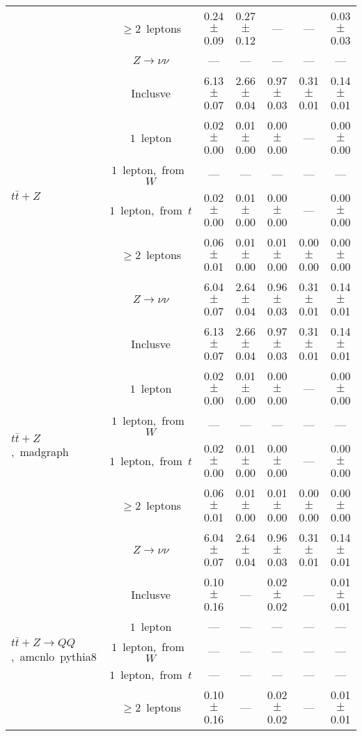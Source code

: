 \documentclass{article}
\begin{document}
\begin{longtable}{|l|c|c|c|c|c|c|}
 & $\ge2$~leptons  & 0.24 $\pm$ 0.09  & 0.27 $\pm$ 0.12  & ---  & ---  & 0.03 $\pm$ 0.03 \\* 
 & $Z\rightarrow\nu\nu$  & ---  & ---  & ---  & ---  & --- \\* 
\hline 
\multirow{6}{*}{$t\bar{t}+Z$} & Inclusve  & 6.13 $\pm$ 0.07  & 2.66 $\pm$ 0.04  & 0.97 $\pm$ 0.03  & 0.31 $\pm$ 0.01  & 0.14 $\pm$ 0.01 \\* 
 & $1$~lepton  & 0.02 $\pm$ 0.00  & 0.01 $\pm$ 0.00  & 0.00 $\pm$ 0.00  & ---  & 0.00 $\pm$ 0.00 \\* 
 & $1$~lepton,~from~$W$  & ---  & ---  & ---  & ---  & --- \\* 
 & $1$~lepton,~from~$t$  & 0.02 $\pm$ 0.00  & 0.01 $\pm$ 0.00  & 0.00 $\pm$ 0.00  & ---  & 0.00 $\pm$ 0.00 \\* 
 & $\ge2$~leptons  & 0.06 $\pm$ 0.01  & 0.01 $\pm$ 0.00  & 0.01 $\pm$ 0.00  & 0.00 $\pm$ 0.00  & 0.00 $\pm$ 0.00 \\* 
 & $Z\rightarrow\nu\nu$  & 6.04 $\pm$ 0.07  & 2.64 $\pm$ 0.04  & 0.96 $\pm$ 0.03  & 0.31 $\pm$ 0.01  & 0.14 $\pm$ 0.01 \\* 
\hline 
\multirow{6}{*}{$t\bar{t}+Z$,~madgraph} & Inclusve  & 6.13 $\pm$ 0.07  & 2.66 $\pm$ 0.04  & 0.97 $\pm$ 0.03  & 0.31 $\pm$ 0.01  & 0.14 $\pm$ 0.01 \\* 
 & $1$~lepton  & 0.02 $\pm$ 0.00  & 0.01 $\pm$ 0.00  & 0.00 $\pm$ 0.00  & ---  & 0.00 $\pm$ 0.00 \\* 
 & $1$~lepton,~from~$W$  & ---  & ---  & ---  & ---  & --- \\* 
 & $1$~lepton,~from~$t$  & 0.02 $\pm$ 0.00  & 0.01 $\pm$ 0.00  & 0.00 $\pm$ 0.00  & ---  & 0.00 $\pm$ 0.00 \\* 
 & $\ge2$~leptons  & 0.06 $\pm$ 0.01  & 0.01 $\pm$ 0.00  & 0.01 $\pm$ 0.00  & 0.00 $\pm$ 0.00  & 0.00 $\pm$ 0.00 \\* 
 & $Z\rightarrow\nu\nu$  & 6.04 $\pm$ 0.07  & 2.64 $\pm$ 0.04  & 0.96 $\pm$ 0.03  & 0.31 $\pm$ 0.01  & 0.14 $\pm$ 0.01 \\* 
\hline 
\multirow{6}{*}{$t\bar{t}+Z{\rightarrow}QQ$,~amcnlo~pythia8} & Inclusve  & 0.10 $\pm$ 0.16  & ---  & 0.02 $\pm$ 0.02  & ---  & 0.01 $\pm$ 0.01 \\* 
 & $1$~lepton  & ---  & ---  & ---  & ---  & --- \\* 
 & $1$~lepton,~from~$W$  & ---  & ---  & ---  & ---  & --- \\* 
 & $1$~lepton,~from~$t$  & ---  & ---  & ---  & ---  & --- \\* 
 & $\ge2$~leptons  & 0.10 $\pm$ 0.16  & ---  & 0.02 $\pm$ 0.02  & ---  & 0.01 $\pm$ 0.01 \\* 

\end{longtable}
\end{document}
